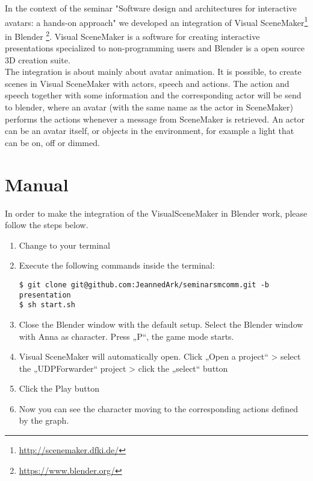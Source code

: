 \documentclass[
10pt, %
a4paper, %
oneside,
headinclude,footinclude, %
BCOR5mm, %
]{scrartcl}
\begin{document}
In the context of the seminar "Software design and architectures for interactive avatars: a hands-on approach" we developed an integration of Visual SceneMaker\footnote{\url{http://scenemaker.dfki.de/}} in Blender \footnote{\url{https://www.blender.org/}}.
Visual SceneMaker is a software for creating interactive presentations specialized to non-programming users and Blender is a open source 3D creation suite.\\
The integration is about mainly about avatar animation. It is possible, to create scenes in Visual SceneMaker with actors, speech and actions. The action and speech together with some information and the corresponding actor will be send to blender, where an avatar (with the same name as the actor in SceneMaker) performs the actions whenever a message from SceneMaker is retrieved. An actor can be an avatar itself, or objects in the environment, for example a light that can be on, off or dimmed.

\section{Manual}
In order to make the integration of the VisualSceneMaker in Blender work, please follow the steps below.
\begin{enumerate}[noitemsep] %
\item Change to your terminal
\item Execute the following commands inside the terminal:
\begin{lstlisting}
$ git clone git@github.com:JeannedArk/seminarsmcomm.git -b presentation
$ sh start.sh
\end{lstlisting}
\item Close the Blender window with the default setup. Select the Blender window with Anna as character. Press „P“, the game mode starts.
\item Visual SceneMaker will automatically open. Click „Open a project“ > select the „UDPForwarder“ project > click the „select“ button
\item Click the Play button
\item Now you can see the character moving to the corresponding actions defined by the graph.
\end{enumerate}
\end{document}
